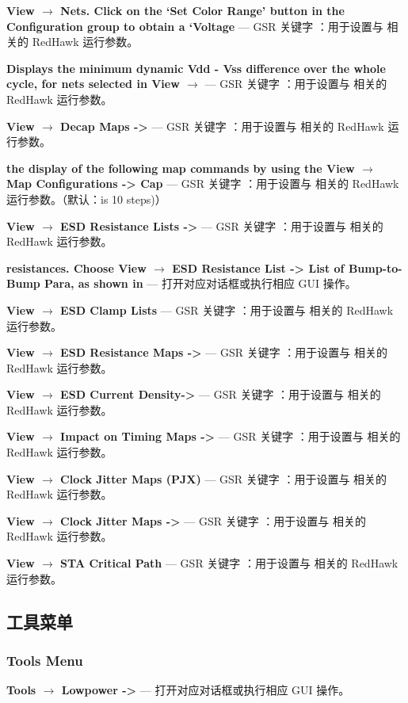 \textbf{View $\rightarrow$ Nets. Click on the ‘Set Color Range’ button in the Configuration group to obtain a ‘Voltage} — GSR 关键字 ：用于设置与  相关的 RedHawk 运行参数。

\textbf{Displays the minimum dynamic Vdd - Vss difference over the whole cycle, for nets selected in View $\rightarrow$ } — GSR 关键字 ：用于设置与  相关的 RedHawk 运行参数。

\textbf{View $\rightarrow$ Decap Maps ->} — GSR 关键字 ：用于设置与  相关的 RedHawk 运行参数。

\textbf{the display of the following map commands by using the View $\rightarrow$ Map Configurations -> Cap} — GSR 关键字 ：用于设置与  相关的 RedHawk 运行参数。（默认：is 10 steps)）

\textbf{View $\rightarrow$ ESD Resistance Lists ->} — GSR 关键字 ：用于设置与  相关的 RedHawk 运行参数。

\textbf{resistances. Choose View $\rightarrow$ ESD Resistance List -> List of Bump-to-Bump Para, as shown in} — 打开对应对话框或执行相应 GUI 操作。

\textbf{View $\rightarrow$ ESD Clamp Lists} — GSR 关键字 ：用于设置与  相关的 RedHawk 运行参数。

\textbf{View $\rightarrow$ ESD Resistance Maps ->} — GSR 关键字 ：用于设置与  相关的 RedHawk 运行参数。

\textbf{View $\rightarrow$ ESD Current Density->} — GSR 关键字 ：用于设置与  相关的 RedHawk 运行参数。

\textbf{View $\rightarrow$ Impact on Timing Maps ->} — GSR 关键字 ：用于设置与  相关的 RedHawk 运行参数。

\textbf{View $\rightarrow$ Clock Jitter Maps (PJX)} — GSR 关键字 ：用于设置与  相关的 RedHawk 运行参数。

\textbf{View $\rightarrow$ Clock Jitter Maps ->} — GSR 关键字 ：用于设置与  相关的 RedHawk 运行参数。

\textbf{View $\rightarrow$ STA Critical Path} — GSR 关键字 ：用于设置与  相关的 RedHawk 运行参数。

\subsection{工具菜单}
\subsubsection*{Tools Menu}

\textbf{Tools $\rightarrow$ Lowpower ->} — 打开对应对话框或执行相应 GUI 操作。

